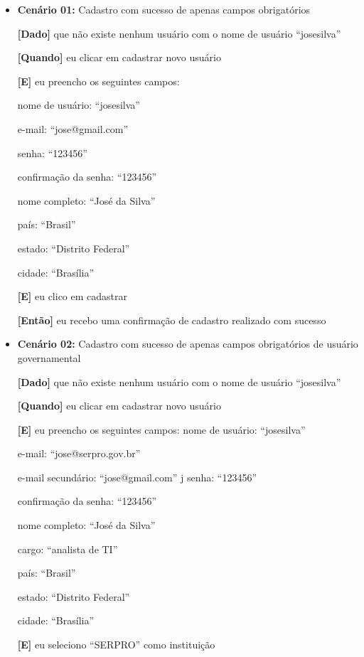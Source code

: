 	\begin{itemize}
	\item\textbf{Cenário 01:} Cadastro com sucesso de apenas campos obrigatórios

	\textbf{[Dado]} que não existe nenhum usuário com o nome de usuário ``josesilva''

	\textbf{[Quando]} eu clicar em cadastrar novo usuário

	\textbf{[E]} eu preencho os seguintes campos: 

  		\subitem nome de usuário: ``josesilva''

  		\subitem e-mail: ``jose@gmail.com''

  		\subitem senha: ``123456''

  		\subitem confirmação da senha: ``123456''

  		\subitem nome completo: ``José da Silva''

  		\subitem país: ``Brasil''

  		\subitem estado: ``Distrito Federal''

  		\subitem cidade: ``Brasília''

	\textbf{[E]} eu clico em cadastrar

	\textbf{[Então]} eu recebo uma confirmação de cadastro realizado com sucesso


	\item\textbf{Cenário 02:} Cadastro com sucesso de apenas campos obrigatórios de usuário governamental
	
	\textbf{[Dado]} que não existe nenhum usuário com o nome de usuário ``josesilva''
	
	\textbf{[Quando]} eu clicar em cadastrar novo usuário
	
	\textbf{[E]} eu preencho os seguintes campos: 
  		\subitem nome de usuário: ``josesilva''

  		\subitem e-mail: ``jose@serpro.gov.br''

  		\subitem e-mail secundário: ``jose@gmail.com''
j
  		\subitem senha: ``123456''

		\subitem confirmação da senha: ``123456''

		\subitem nome completo: ``José da Silva''

		\subitem cargo: ``analista de TI''

		\subitem país: ``Brasil''

		 \subitem estado: ``Distrito Federal''

		\subitem cidade: ``Brasília''

	\textbf{[E]} eu seleciono ``SERPRO'' como instituição


\end{itemize}
